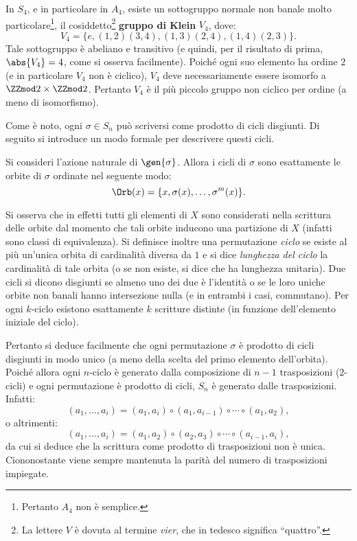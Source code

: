 \documentclass[12pt]{scrartcl}
\begin{document}
	\begin{example}
		In $S_4$, e in particolare in $A_4$, esiste un sottogruppo normale non banale
		molto particolare\footnote{
			Pertanto $A_4$ non è semplice.
		}, il cosiddetto\footnote{
			La lettere $V$ è dovuta al termine \textit{vier}, che in tedesco
			significa ``quattro''.
		} \textbf{gruppo di Klein} $V_4$, dove:
		\[ V_4 = \{ e, (1, 2)(3, 4), (1, 3)(2, 4), (1, 4)(2, 3) \}. \]
		Tale sottogruppo è abeliano e transitivo (e quindi, per il risultato di prima,
		$\abs{V_4} = 4$, come si osserva facilmente). Poiché ogni suo elemento ha
		ordine $2$ (e in particolare $V_4$ non è ciclico), $V_4$ deve necessariamente
		essere isomorfo a $\ZZmod2 \times \ZZmod2$. Pertanto $V_4$ è il più piccolo
		gruppo non ciclico per ordine (a meno di isomorfismo).
	\end{example}
	
	Come è noto, ogni $\sigma \in S_n$ può scriversi come prodotto di cicli
	disgiunti. Di seguito si introduce un modo formale per descrivere questi
	cicli. \medskip
	
	
	Si consideri l'azione naturale di $\gen{\sigma}$. Allora i cicli di $\sigma$ sono esattamente
	le orbite di $\sigma$ ordinate nel seguente modo:
	\[ \Orb(x) = \{ x, \sigma(x), \dots, \sigma^m(x) \}. \]

	
	Si osserva che in effetti tutti gli elementi di $X$ sono considerati nella
	scrittura delle orbite dal momento che tali orbite inducono una partizione
	di $X$ (infatti sono classi di equivalenza). Si definisce inoltre una
	permutazione \textit{ciclo} se esiste al più un'unica orbita di cardinalità diversa
	da $1$ e si dice \textit{lunghezza del ciclo} la cardinalità di tale orbita (o se non esiste, si dice che ha lunghezza unitaria). Due cicli si dicono disgiunti se almeno uno dei due è l'identità o se le loro uniche orbite non banali hanno intersezione nulla (e in entrambi i casi, commutano). Per ogni $k$-ciclo esistono esattamente $k$ scritture
	distinte (in funzione dell'elemento iniziale del ciclo). \medskip
	
	
	Pertanto si deduce facilmente che ogni permutazione $\sigma$ è prodotto
	di cicli disgiunti in modo unico (a meno della scelta del primo elemento
	dell'orbita). Poiché allora ogni $n$-ciclo è generato dalla composizione
	di $n-1$ trasposizioni ($2$-cicli) e ogni permutazione è prodotto di cicli,
	$S_n$ è generato dalle trasposizioni. Infatti:
	\[ (a_1, \dots, a_i) = (a_1, a_i) \circ (a_1, a_{i-1}) \circ \cdots \circ (a_1, a_2), \]
	o altrimenti:
	\[ (a_1, \dots, a_i) = (a_1, a_2) \circ (a_2, a_3) \circ \cdots \circ (a_{i-1}, a_i), \]
	da cui si deduce che la scrittura come prodotto di
	trasposizioni non è unica. Ciononostante viene sempre mantenuta la parità
	del numero di trasposizioni impiegate. \medskip
	
\end{document}
